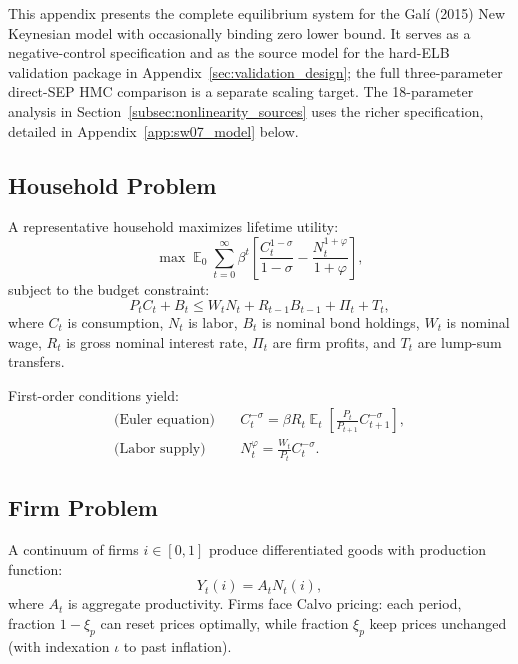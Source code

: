 \documentclass[12pt]{article}
\theoremstyle{plain}
\theoremstyle{definition}
\theoremstyle{remark}
\DeclareMathOperator{\E}{\mathbb{E}}
\begin{document}
This appendix presents the complete equilibrium system for the Gal\'i (2015) New Keynesian model with occasionally binding zero lower bound. It serves as a negative-control specification and as the source model for the hard-ELB validation package in Appendix~\ref{sec:validation_design}; the full three-parameter direct-SEP HMC comparison is a separate scaling target. The 18-parameter analysis in Section~\ref{subsec:nonlinearity_sources} uses the richer \citet{smets2007shocks} specification, detailed in Appendix~\ref{app:sw07_model} below.


\subsection{Household Problem}

A representative household maximizes lifetime utility:
\begin{equation}
\max \E_0 \sum_{t=0}^\infty \beta^t \left[ \frac{C_t^{1-\sigma}}{1-\sigma} - \frac{N_t^{1+\varphi}}{1+\varphi} \right],
\end{equation}
subject to the budget constraint:
\begin{equation}
P_t C_t + B_t \leq W_t N_t + R_{t-1} B_{t-1} + \Pi_t + T_t,
\end{equation}
where $C_t$ is consumption, $N_t$ is labor, $B_t$ is nominal bond holdings, $W_t$ is nominal wage, $R_t$ is gross nominal interest rate, $\Pi_t$ are firm profits, and $T_t$ are lump-sum transfers.

First-order conditions yield:
\begin{align}
\text{(Euler equation)} \quad & C_t^{-\sigma} = \beta R_t \E_t\left[ \frac{P_t}{P_{t+1}} C_{t+1}^{-\sigma} \right], \label{eq:euler_full} \\
\text{(Labor supply)} \quad & N_t^\varphi = \frac{W_t}{P_t} C_t^{-\sigma}. \label{eq:labor_supply_full}
\end{align}


\subsection{Firm Problem}

A continuum of firms $i \in [0,1]$ produce differentiated goods with production function:
\begin{equation}
Y_t(i) = A_t N_t(i),
\end{equation}
where $A_t$ is aggregate productivity. Firms face Calvo pricing: each period, fraction $1-\xi_p$ can reset prices optimally, while fraction $\xi_p$ keep prices unchanged (with indexation $\iota$ to past inflation).
\end{document}

